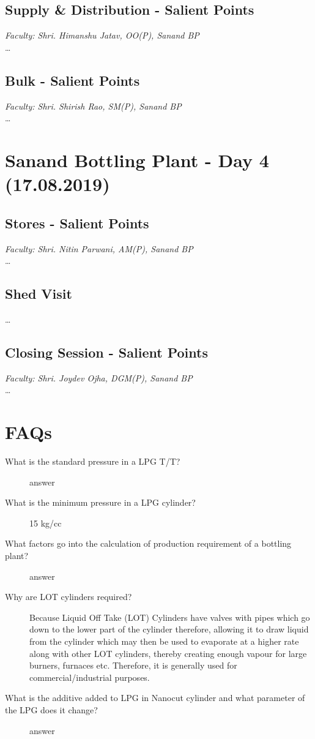 \documentclass{report}
\begin{document}
	\subsection{Supply \& Distribution - Salient Points}
	\textit{Faculty: Shri. Himanshu Jatav, OO(P), Sanand BP}\\
	\ldots
	
	\subsection{Bulk - Salient Points}
	\textit{Faculty: Shri. Shirish Rao, SM(P), Sanand BP}\\
	\ldots
	
	\section{Sanand Bottling Plant - Day 4 (17.08.2019)}
	\subsection{Stores - Salient Points}
	\textit{Faculty: Shri. Nitin Parwani, AM(P), Sanand BP}\\
	\ldots
	
	\subsection{Shed Visit}
	\ldots
	
	\subsection{Closing Session - Salient Points}
	\textit{Faculty: Shri. Joydev Ojha, DGM(P), Sanand BP}\\
	\ldots
	
	\section{FAQs}
	\begin{description}
		\item[What is the standard pressure in a LPG T/T?] answer
		\item[What is the minimum pressure in a LPG cylinder?] 15 kg/cc
		\item[What factors go into the calculation of production requirement of a bottling plant?] answer
		\item[Why are LOT cylinders required?] Because Liquid Off Take (LOT) Cylinders have valves with pipes which go down to the lower part of the cylinder therefore, allowing it to draw liquid from the cylinder which may then be used to evaporate at a higher rate along with other LOT cylinders, thereby creating enough vapour for large burners, furnaces etc. Therefore, it is generally used for commercial/industrial purposes.
		\item[What is the additive added to LPG in Nanocut cylinder and what parameter of the LPG does it change?] answer
	\end{description}
\end{document}
